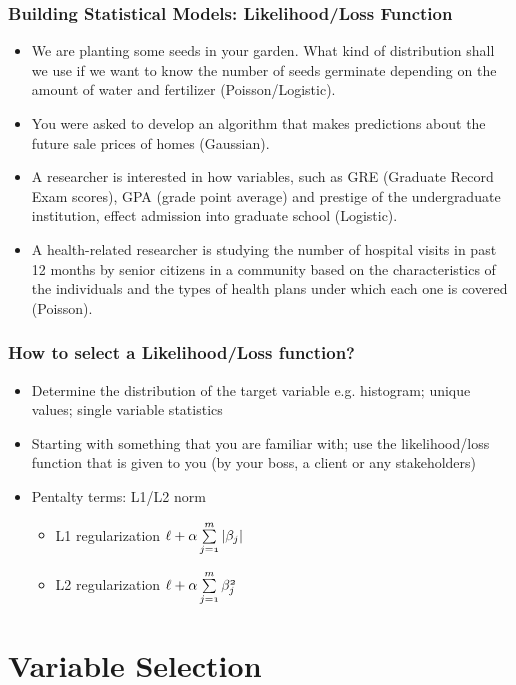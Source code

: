 \documentclass[notheorems, aspectratio=54, tikz,border=10pt,multi]{beamer}
\begin{document}
\begin{frame}
\frametitle{Building Statistical Models: Likelihood/Loss Function}
\begin{itemize}
\item We are planting some seeds in your garden. What kind of distribution shall we use if we want to know the number of seeds germinate depending on the amount of water and fertilizer (Poisson/Logistic).
\item You were asked to develop an algorithm that makes predictions about the future sale prices of homes (Gaussian).
\item A researcher is interested in how variables, such as GRE (Graduate Record Exam scores), GPA (grade point average) and prestige of the undergraduate institution, effect admission into graduate school (Logistic).
\item A health-related researcher is studying the number of hospital visits in past 12 months by senior citizens in a community based on the characteristics of the individuals and the types of health plans under which each one is covered (Poisson).
\end{itemize}

\end{frame}


\begin{frame}
\frametitle{How to select a Likelihood/Loss function?}
\begin{itemize}
\item Determine the distribution of the target variable e.g. histogram; unique values; single variable statistics
\item Starting with something that you are familiar with; use the likelihood/loss function that is given to you (by your boss, a client or any stakeholders)
\item Pentalty terms: L1/L2 norm 
\begin{itemize}
\item L1 regularization $\mathnormal{\ell+\alpha \sum\limits_{j=1}^m|\beta_j|}$
\item L2 regularization $\mathnormal{\ell+\alpha \sum\limits_{j=1}^m\beta_j^2}$
\end{itemize}


\end{itemize}
\end{frame}

\section{Variable Selection}
\end{document}
